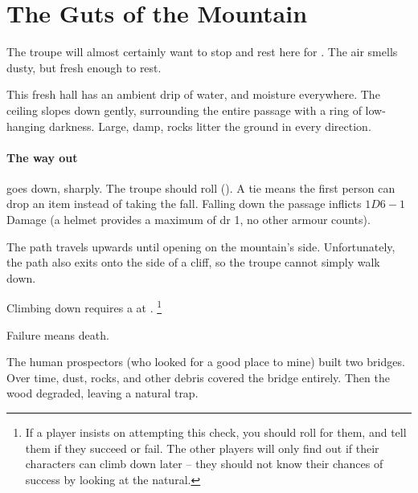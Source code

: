 \section{The Guts of the Mountain}

\begin{multicols}{2}

\renewcommand\npcsymbol{\glsentrysymbol{yonder}}

The troupe will almost certainly want to stop and rest here for .
The air smells dusty, but fresh enough to rest.

\begin{boxtext}
  This fresh hall has an ambient drip of water, and moisture everywhere.
  The ceiling slopes down gently, surrounding the entire passage with a ring of low-hanging darkness.
  Large, damp, rocks litter the ground in every direction.
\end{boxtext}

\paragraph{The way out}
goes down, sharply.
The troupe should roll  (\tn[10]).
A tie means the first person can drop an item instead of taking the fall.
Falling down the passage inflicts $1D6-1$ Damage (a helmet provides a maximum of \gls{dr} 1, no other armour counts).




The path travels upwards until opening on the mountain's side.
Unfortunately, the path also exits onto the side of a cliff, so the troupe cannot simply walk down.

Climbing down requires a  at \tn[14].%
\footnote{If a player insists on attempting this check, you should roll for them, and tell them if they succeed or fail.  The other players will only find out if their characters can climb down later -- they should not know their chances of success by looking at the \gls{natural}.}

Failure means death.



\begin{exampletext}
  The human prospectors (who looked for a good place to mine) built two bridges.
  Over time, dust, rocks, and other debris covered the bridge entirely.
  Then the wood degraded, leaving a natural trap.


\end{exampletext}
\end{multicols}
